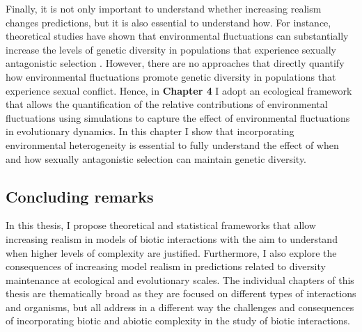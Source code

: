 \documentclass[12pt]{article}
\begin{document}
Finally, it is not only important to understand whether increasing realism changes predictions, but it is also essential to understand how. For instance, theoretical studies have shown that environmental fluctuations can substantially increase the levels of genetic diversity in populations that experience sexually antagonistic selection \citep{connallon2012general,connallon_evolutionary_2019,patten2010fitness,jordan2012potential}. However, there are no approaches that directly quantify how environmental fluctuations promote genetic diversity in populations that experience sexual conflict. Hence, in \textbf{Chapter 4} I adopt an ecological framework that allows the quantification of the relative contributions of environmental fluctuations using simulations to capture the effect of environmental fluctuations in evolutionary dynamics. In this chapter I show that incorporating environmental heterogeneity is essential to fully understand the effect of when and how sexually antagonistic selection can maintain genetic diversity.



\subsection*{Concluding remarks}


In this thesis, I propose theoretical and statistical frameworks that allow increasing realism in models of biotic interactions with the aim to understand when higher levels of complexity are justified. Furthermore, I also explore the consequences of increasing model realism in predictions related to diversity maintenance at ecological and evolutionary scales. The individual chapters of this thesis are thematically broad as they are focused on different types of interactions and organisms, but all address in a different way the challenges and consequences of incorporating biotic and abiotic complexity in the study of biotic interactions.




\clearpage


\end{document}
